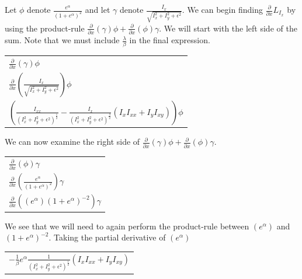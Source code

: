 \documentclass{article}
\begin{document}
    \noindent
    Let $\phi$ denote $\frac{e^\alpha}{(1+e^{\alpha})^2}$ and let $\gamma$ denote $\frac{I_{x}}{\sqrt{I_{x}^2 + I_{y}^2 + \epsilon^2}}$.
    We can begin finding $\frac{\partial}{\partial x}L_{I_{x}}$ by using the product-rule $\frac{\partial}{\partial x}(\gamma)\phi + \frac{\partial}{\partial x}(\phi)\gamma$.
    We will start with the left side of the sum. Note that we must include $\frac{\lambda}{\beta}$ in the final expression.\\
    \begin{center}
      \begin{tabular}{l}
        \vspace{12pt}
        $\frac{\partial}{\partial x}(\gamma)\phi$\\
        \vspace{12pt}
        $\frac{\partial}{\partial x}(\frac{I_{x}}{\sqrt{I_{x}^2 + I_{y}^2 + \epsilon^2}})\phi$\\
        $(\frac{I_{xx}}{(I_{x}^2 + I_{y}^2 + \epsilon^2)^\frac{1}{2}} - \frac{I_{x}}{(I_{x}^2 + I_{y}^2 + \epsilon^2)^\frac{3}{2}}(I_{x}I_{xx} + I_{y}I_{xy}))\phi$
      \end{tabular}
    \end{center}
    \vspace{12pt}
    
    \newpage
    \noindent
    We can now examine the right side of $\frac{\partial}{\partial x}(\gamma)\phi + \frac{\partial}{\partial x}(\phi)\gamma$.
    \begin{center}
      \begin{tabular}{l}
        $\frac{\partial}{\partial x}(\phi)\gamma$\\
        $\frac{\partial}{\partial x}(\frac{e^\alpha}{(1+e^{\alpha})^2})\gamma$\\
        $\frac{\partial}{\partial x}((e^\alpha)(1+e^{\alpha})^{-2})\gamma$\\
      \end{tabular}
    \end{center}

    \noindent
    We see that we will need to again perform the product-rule between $(e^\alpha)$ and\\
    $(1+e^{\alpha})^{-2}$. Taking the partial derivative of $(e^\alpha)$
    \begin{center}
      \begin{tabular}{l}
        $-\frac{1}{\beta} e^{\alpha} \frac{1}{(I_{x}^2 + I_{y}^2 + \epsilon^2)^\frac{1}{2}} (I_{x}I_{xx}+I_{y}I_{xy})$
      \end{tabular}
    \end{center}
\end{document}
